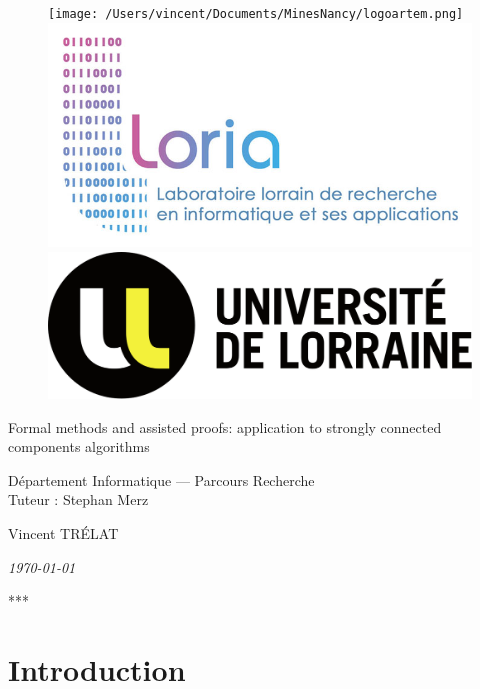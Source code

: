 \documentclass[a4 paper, 12pt]{article}
\theoremstyle{definition}
\begin{document}
\begin{titlepage}
    \begin{figure}[!h]
        \centering
        \texttt{[image: /Users/vincent/Documents/MinesNancy/logoartem.png]}
        \hspace{1cm}
        \includegraphics[height = .1\textwidth]{img/logoloria.jpg}
        \hspace{1cm}
        \includegraphics[height = .1\textwidth]{img/logoUL.png}
    \end{figure}
    \vspace{3cm}

    \begin{center}
        \huge{Formal methods and assisted proofs: application to strongly connected components algorithms}
    \end{center}
    \vspace{1cm}
    \begin{center}
        \large{Département Informatique --- Parcours Recherche \\ Tuteur : Stephan Merz}
    \end{center}
    \vspace{1 cm}
    \begin{center}
        Vincent TRÉLAT
    \end{center}
    \vspace{2 cm}
    \begin{center}
        \textit{\today}
    \end{center}
    \vspace{2 cm}
    \begin{center}
        ***
    \end{center}
    
\end{titlepage}
\restoregeometry
\pagebreak

\pagebreak

\tableofcontents
\pagebreak

\section{Introduction}
\end{document}
